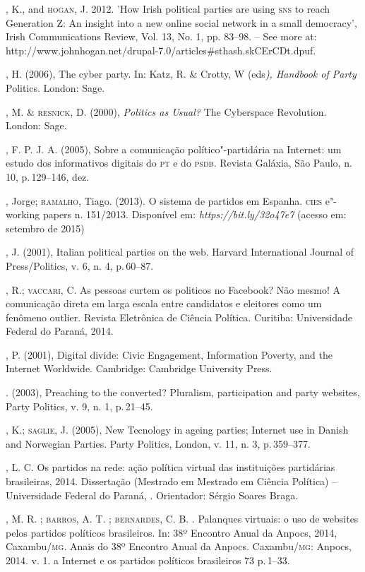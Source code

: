 \begin{bibliohedra}
, K., and \textsc{hogan}, J. 2012. 'How Irish political parties are using
\textsc{sns} to reach Generation Z: An insight into a new online social network
in a small democracy', Irish Communications Review, Vol. 13, No. 1, pp.
83--98. -- See more at:
http://www.johnhogan.net/drupal-7.0/articles\#sthash.skCErCDt.dpuf.

, H. (2006), The cyber party. In: Katz, R. \& Crotty, W
(eds\emph{), Handbook of Party} Politics. London: Sage.

, M. \& \textsc{resnick}, D. (2000), \emph{Politics as Usual?} The
Cyberspace Revolution. London: Sage.

, F. P. J. A. (2005), Sobre a comunicação político"-partidária na
Internet: um estudo dos informativos digitais do \textsc{pt} e do \textsc{psdb}. Revista
Galáxia, São Paulo, n. 10, p.\,129--146, dez.

, Jorge; \textsc{ramalho}, Tiago. (2013). O sistema de partidos em Espanha.
\textsc{cies} e"-working papers n. 151/2013. Disponível em:
\emph{https://bit.ly/32o47e7}
(acesso em: setembro de 2015)

, J. (2001), Italian political parties on the web. Harvard
International Journal of Press/Politics, v. 6, n. 4, p.\,60--87.

, R.; \textsc{vaccari}, C. As pessoas curtem os politicos no Facebook? Não
mesmo! A comunicação direta em larga escala entre candidatos e eleitores
como um fenômeno outlier. Revista Eletrônica de Ciência Política.
Curitiba: Universidade Federal do Paraná, 2014.

, P. (2001), Digital divide: Civic Engagement, Information
Poverty, and the Internet Worldwide. Cambridge: Cambridge University
Press.

\titidem. (2003), Preaching to the converted? Pluralism, participation
and party websites, Party Politics, v. 9, n. 1, p.\,21--45.

, K.; \textsc{saglie}, J. (2005), New Tecnology in ageing parties;
Internet use in Danish and Norwegian Parties. Party Politics, London, v.
11, n. 3, p.\,359--377.

, L. C. Os partidos na rede: ação política virtual das instituições
partidárias brasileiras, 2014. Dissertação (Mestrado em Mestrado em
Ciência Política) -- Universidade Federal do Paraná, . Orientador:
Sérgio Soares Braga.

, M. R. ; \textsc{barros}, A. T. ; \textsc{bernardes}, C. B. . Palanques
virtuais: o uso de websites pelos partidos políticos brasileiros. In:
38º Encontro Anual da Anpocs, 2014, Caxambu/\textsc{mg}. Anais do 38º Encontro
Anual da Anpocs. Caxambu/\textsc{mg}: Anpocs, 2014. v. 1. a Internet e os
partidos políticos brasileiros 73 p.\,1--33.


\end{bibliohedra}
